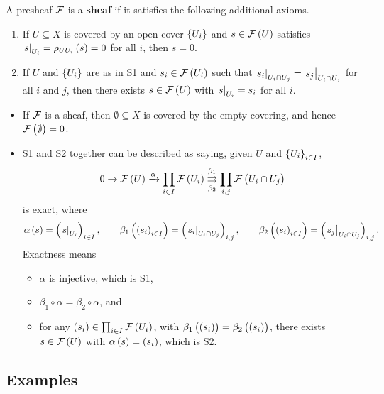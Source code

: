 \begin{definition*}
A presheaf $ \mathcal{F} $ is a \textbf{sheaf} if it satisfies the following additional axioms.
\begin{enumerate}[label=S\arabic*.]
\item If $ U \subseteq X $ is covered by an open cover $ \cbr{U_i} $ and $ s \in \FFF\br{U} $ satisfies $ \eval{s}_{U_i} = \rho_{UU_i}\br{s} = 0 $ for all $ i $, then $ s = 0 $.
\item If $ U $ and $ \cbr{U_i} $ are as in S1 and $ s_i \in \FFF\br{U_i} $ such that $ \left. s_i \right|_{U_i \cap U_j} = \left. s_j \right|_{U_i \cap U_j} $ for all $ i $ and $ j $, then there exists $ s \in \FFF\br{U} $ with $ \left. s \right|_{U_i} = s_i $ for all $ i $.
\end{enumerate}
\end{definition*}

\begin{remark*}
\hfill
\begin{itemize}
\item If $ \mathcal{F} $ is a sheaf, then $ \emptyset \subseteq X $ is covered by the empty covering, and hence $ \FFF\br{\emptyset} = 0 $.
\item S1 and S2 together can be described as saying, given $ U $ and $ \cbr{U_i}_{i \in I} $,
$$ 0 \to \FFF\br{U} \xrightarrow{\alpha} \prod_{i \in I} \FFF\br{U_i} \overset{\beta_1}{\underset{\beta_2}{\rightrightarrows}} \prod_{i, j} \FFF\br{U_i \cap U_j} $$
is exact, where
$$ \alpha\br{s} = \br{\eval{s}_{U_i}}_{i \in I}, \qquad \beta_1\br{\br{s_i}_{i \in I}} = \br{\eval{s_i}_{U_i \cap U_j}}_{i, j}, \qquad \beta_2\br{\br{s_i}_{i \in I}} = \br{\eval{s_j}_{U_i \cap U_j}}_{i, j}. $$
Exactness means
\begin{itemize}
\item $ \alpha $ is injective, which is S1,
\item $ \beta_1 \circ \alpha = \beta_2 \circ \alpha $, and
\item for any $ \br{s_i} \in \prod_{i \in I} \FFF\br{U_i} $, with $ \beta_1\br{\br{s_i}} = \beta_2\br{\br{s_i}} $, there exists $ s \in \FFF\br{U} $ with $ \alpha\br{s} = \br{s_i} $, which is S2.
\end{itemize}
\end{itemize}
\end{remark*}

\pagebreak

\subsection{Examples}

